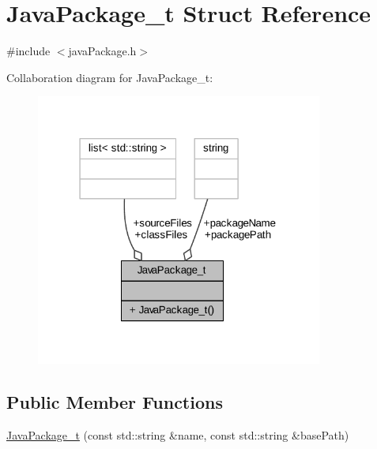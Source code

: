 \hypertarget{struct_java_package__t}{}\section{Java\+Package\+\_\+t Struct Reference}
\label{struct_java_package__t}


{\ttfamily \#include $<$java\+Package.\+h$>$}



Collaboration diagram for Java\+Package\+\_\+t\+:
\nopagebreak
\begin{figure}[H]
\begin{center}
\leavevmode
\includegraphics[width=267pt]{struct_java_package__t__coll__graph}
\end{center}
\end{figure}
\subsection*{Public Member Functions}
\begin{DoxyCompactItemize}
\item 
\hyperlink{struct_java_package__t_a1e1fec25326b5f4ebcaa149f48d7dfae}{Java\+Package\+\_\+t} (const std\+::string \&name, const std\+::string \&base\+Path)
\end{DoxyCompactItemize}
